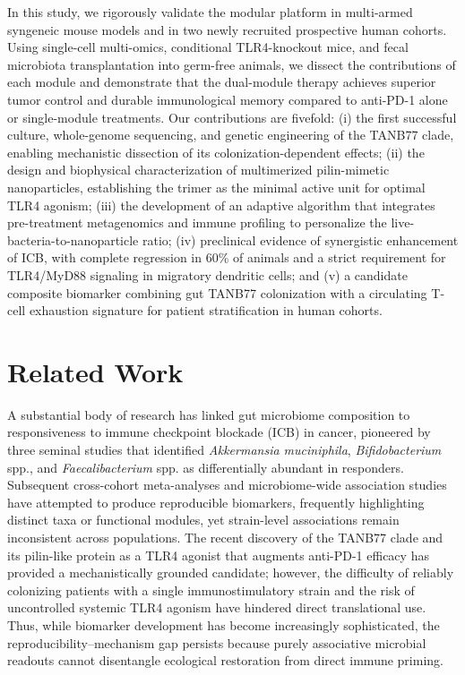 \documentclass{article}
\begin{document}
In this study, we rigorously validate the modular platform in multi-armed syngeneic mouse models and in two newly recruited prospective human cohorts. Using single-cell multi-omics, conditional TLR4-knockout mice, and fecal microbiota transplantation into germ-free animals, we dissect the contributions of each module and demonstrate that the dual-module therapy achieves superior tumor control and durable immunological memory compared to anti-PD-1 alone or single-module treatments. Our contributions are fivefold: (i) the first successful culture, whole-genome sequencing, and genetic engineering of the TANB77 clade, enabling mechanistic dissection of its colonization-dependent effects; (ii) the design and biophysical characterization of multimerized pilin-mimetic nanoparticles, establishing the trimer as the minimal active unit for optimal TLR4 agonism; (iii) the development of an adaptive algorithm that integrates pre-treatment metagenomics and immune profiling to personalize the live-bacteria-to-nanoparticle ratio; (iv) preclinical evidence of synergistic enhancement of ICB, with complete regression in 60\% of animals and a strict requirement for TLR4/MyD88 signaling in migratory dendritic cells; and (v) a candidate composite biomarker combining gut TANB77 colonization with a circulating T-cell exhaustion signature for patient stratification in human cohorts.

\section{Related Work}

A substantial body of research has linked gut microbiome composition to responsiveness to immune checkpoint blockade (ICB) in cancer, pioneered by three seminal studies that identified \textit{Akkermansia muciniphila}, \textit{Bifidobacterium} spp., and \textit{Faecalibacterium} spp. as differentially abundant in responders\cite{routy2018gut,gopalakrishnan2018gut,matson2018commensal}. Subsequent cross-cohort meta-analyses and microbiome-wide association studies have attempted to produce reproducible biomarkers, frequently highlighting distinct taxa or functional modules, yet strain-level associations remain inconsistent across populations\cite{lee2022cross,lima2020discovery}. The recent discovery of the TANB77 clade and its pilin-like protein as a TLR4 agonist that augments anti-PD-1 efficacy has provided a mechanistically grounded candidate\cite{zhang2023tanb77}; however, the difficulty of reliably colonizing patients with a single immunostimulatory strain and the risk of uncontrolled systemic TLR4 agonism have hindered direct translational use. Thus, while biomarker development has become increasingly sophisticated, the reproducibility–mechanism gap persists because purely associative microbial readouts cannot disentangle ecological restoration from direct immune priming.
\end{document}
